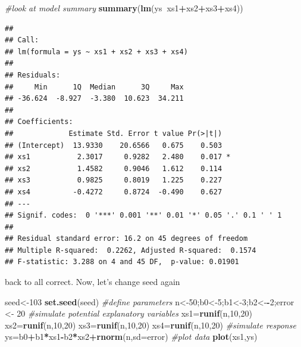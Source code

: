 \documentclass[
]{book}
\newenvironment{Shaded}{\begin{snugshade}}{\end{snugshade}}
\newcommand{\CommentTok}[1]{\textcolor[rgb]{0.56,0.35,0.01}{\textit{#1}}}
\newcommand{\DataTypeTok}[1]{\textcolor[rgb]{0.13,0.29,0.53}{#1}}
\newcommand{\DecValTok}[1]{\textcolor[rgb]{0.00,0.00,0.81}{#1}}
\newcommand{\KeywordTok}[1]{\textcolor[rgb]{0.13,0.29,0.53}{\textbf{#1}}}
\newcommand{\NormalTok}[1]{#1}
\newcommand{\OperatorTok}[1]{\textcolor[rgb]{0.81,0.36,0.00}{\textbf{#1}}}
\newcommand{\StringTok}[1]{\textcolor[rgb]{0.31,0.60,0.02}{#1}}
\begin{document}
\begin{Shaded}
\begin{Highlighting}[]
\CommentTok{#look at model summary}
\KeywordTok{summary}\NormalTok{(}\KeywordTok{lm}\NormalTok{(ys}\OperatorTok{~}\NormalTok{xs1}\OperatorTok{+}\NormalTok{xs2}\OperatorTok{+}\NormalTok{xs3}\OperatorTok{+}\NormalTok{xs4))}
\end{Highlighting}
\end{Shaded}

\begin{verbatim}
## 
## Call:
## lm(formula = ys ~ xs1 + xs2 + xs3 + xs4)
## 
## Residuals:
##     Min      1Q  Median      3Q     Max 
## -36.624  -8.927  -3.380  10.623  34.211 
## 
## Coefficients:
##             Estimate Std. Error t value Pr(>|t|)  
## (Intercept)  13.9330    20.6566   0.675    0.503  
## xs1           2.3017     0.9282   2.480    0.017 *
## xs2           1.4582     0.9046   1.612    0.114  
## xs3           0.9825     0.8019   1.225    0.227  
## xs4          -0.4272     0.8724  -0.490    0.627  
## ---
## Signif. codes:  0 '***' 0.001 '**' 0.01 '*' 0.05 '.' 0.1 ' ' 1
## 
## Residual standard error: 16.2 on 45 degrees of freedom
## Multiple R-squared:  0.2262,	Adjusted R-squared:  0.1574 
## F-statistic: 3.288 on 4 and 45 DF,  p-value: 0.01901
\end{verbatim}

back to all correct. Now, let's change seed again

\begin{Shaded}
\begin{Highlighting}[]
\NormalTok{seed<-}\DecValTok{103}
\KeywordTok{set.seed}\NormalTok{(seed)}
\CommentTok{#define parameters}
\NormalTok{n<-}\DecValTok{50}\NormalTok{;b0<-}\DecValTok{5}\NormalTok{;b1<-}\DecValTok{3}\NormalTok{;b2<-}\OperatorTok{-}\DecValTok{2}\NormalTok{;error <-}\StringTok{ }\DecValTok{20}
\CommentTok{#simulate potential explanatory variables}
\NormalTok{xs1=}\KeywordTok{runif}\NormalTok{(n,}\DecValTok{10}\NormalTok{,}\DecValTok{20}\NormalTok{)}
\NormalTok{xs2=}\KeywordTok{runif}\NormalTok{(n,}\DecValTok{10}\NormalTok{,}\DecValTok{20}\NormalTok{)}
\NormalTok{xs3=}\KeywordTok{runif}\NormalTok{(n,}\DecValTok{10}\NormalTok{,}\DecValTok{20}\NormalTok{)}
\NormalTok{xs4=}\KeywordTok{runif}\NormalTok{(n,}\DecValTok{10}\NormalTok{,}\DecValTok{20}\NormalTok{)}
\CommentTok{#simulate response}
\NormalTok{ys=b0}\OperatorTok{+}\NormalTok{b1}\OperatorTok{*}\NormalTok{xs1}\OperatorTok{-}\NormalTok{b2}\OperatorTok{*}\NormalTok{xs2}\OperatorTok{+}\KeywordTok{rnorm}\NormalTok{(n,}\DataTypeTok{sd=}\NormalTok{error)}
\CommentTok{#plot data}
\KeywordTok{plot}\NormalTok{(xs1,ys)}
\end{Highlighting}
\end{Shaded}
\end{document}
